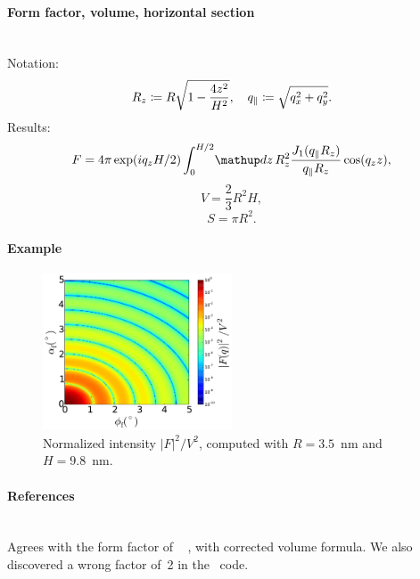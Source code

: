 \paragraph{Form factor, volume, horizontal section}\strut\\
Notation:
\begin{equation*}
 R_z \coloneqq R\sqrt{1-\frac{4z^2}{H^2}},\quad
 q_\parallel \coloneqq \sqrt{q_x^2+q_y^2}.
\end{equation*}
Results:
\begin{equation*}
  F = 4\pi \exp(i q_z H/2) \int_0^{H/2} \!\d z\,
     R_z^2 \frac{J_1(q_{\parallel}R_z)}{q_{\parallel}R_z} \cos(q_z z),
\end{equation*}
\begin{equation*}
  V =\dfrac{2}{3}R^2H,
\end{equation*}
\begin{equation*}
  S =\pi R^2.
\end{equation*}

\paragraph{Example}\strut

\begin{figure}[H]
\begin{center}
\includegraphics[width=0.5\textwidth]{fig/ff2/ff_FullSpheroid.pdf}
\end{center}
\caption{Normalized intensity $|F|^2/V^2$,
computed with $R=3.5$~nm and $H=9.8$~nm.}
\end{figure}

\paragraph{References}\strut\\
Agrees with the  form factor of \IsGISAXS\
\cite[Eq.~2.37]{Laz08} \cite[Eq.~227]{ReLL09},
with corrected volume formula.
We also discovered a wrong factor of~2 in the \IsGISAXS\ code.


